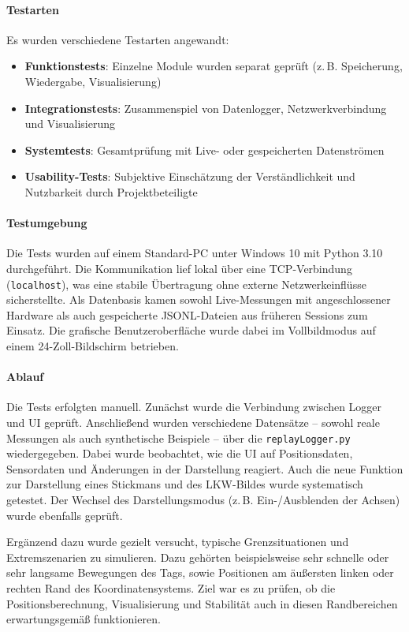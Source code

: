 \documentclass[a4paper, 12pt]{article} %
\begin{document}
\paragraph{Testarten}
Es wurden verschiedene Testarten angewandt:
\begin{itemize}
    \item \textbf{Funktionstests}: Einzelne Module wurden separat geprüft (z.\,B. Speicherung, Wiedergabe, Visualisierung)
    \item \textbf{Integrationstests}: Zusammenspiel von Datenlogger, Netzwerkverbindung und Visualisierung
    \item \textbf{Systemtests}: Gesamtprüfung mit Live- oder gespeicherten Datenströmen
    \item \textbf{Usability-Tests}: Subjektive Einschätzung der Verständlichkeit und Nutzbarkeit durch Projektbeteiligte
\end{itemize}

\paragraph{Testumgebung}
Die Tests wurden auf einem Standard-PC unter Windows 10 mit Python 3.10 durchgeführt. Die Kommunikation lief lokal über eine TCP-Verbindung 
(\texttt{localhost}), was eine stabile Übertragung ohne externe Netzwerkeinflüsse sicherstellte. Als Datenbasis kamen sowohl Live-Messungen mit 
angeschlossener Hardware als auch gespeicherte JSONL-Dateien aus früheren Sessions zum Einsatz. Die grafische Benutzeroberfläche wurde dabei im 
Vollbildmodus auf einem 24-Zoll-Bildschirm betrieben.

\paragraph{Ablauf}
Die Tests erfolgten manuell. Zunächst wurde die Verbindung zwischen Logger und UI geprüft. Anschließend wurden verschiedene Datensätze -- sowohl reale
 Messungen als auch synthetische Beispiele -- über die \texttt{replayLogger.py} wiedergegeben. Dabei wurde beobachtet, wie die UI auf Positionsdaten, 
 Sensordaten und Änderungen in der Darstellung reagiert. Auch die neue Funktion zur Darstellung eines Stickmans und des LKW-Bildes wurde systematisch 
 getestet. Der Wechsel des Darstellungsmodus (z.\,B. Ein-/Ausblenden der Achsen) wurde ebenfalls geprüft.

Ergänzend dazu wurde gezielt versucht, typische Grenzsituationen und Extremszenarien zu simulieren. Dazu gehörten beispielsweise sehr schnelle oder 
sehr langsame Bewegungen des Tags, sowie Positionen am äußersten linken oder rechten Rand des Koordinatensystems. Ziel war es zu prüfen, ob die 
Positionsberechnung, Visualisierung und Stabilität auch in diesen Randbereichen erwartungsgemäß funktionieren.
\end{document}
